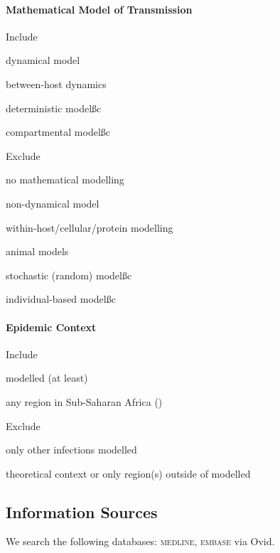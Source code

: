 \documentclass{article}
\begin{document}
\paragraph{Mathematical Model of Transmission}\n
\begin{criteria}{Include}
  \item dynamical model\footnotemark[1]
  \item between-host dynamics
  \item deterministic model\ss{c}
  \item compartmental model\ss{c}
\end{criteria}
\begin{criteria}{Exclude}
  \item no mathematical modelling
  \item non-dynamical model
  \item within-host/cellular/protein modelling
  \item animal models
  \item stochastic (random) model\ss{c}
  \item individual-based model\ss{c}
\end{criteria}
\paragraph{Epidemic Context}\n
\begin{criteria}{Include}
  \item \hiv modelled (at least)
  \item any region in Sub-Saharan Africa (\ssa)
\end{criteria}
\begin{criteria}{Exclude}
  \item only other infections modelled
  \item theoretical context or only region(s) outside of \ssa modelled
\end{criteria}
\clearpage %
\subsection{Information Sources}
We search the following databases: \textsc{medline}, \textsc{embase} via Ovid.
\end{document}
